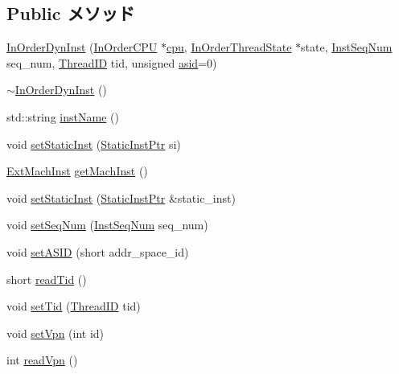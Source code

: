 \subsection*{Public メソッド}
\begin{DoxyCompactItemize}
\item 
\hyperlink{classInOrderDynInst_ab2dc23a7d8b60619acd58194f72f053a}{InOrderDynInst} (\hyperlink{classInOrderCPU}{InOrderCPU} $\ast$\hyperlink{classInOrderDynInst_a41d682c28d0f49e04393c52815808782}{cpu}, \hyperlink{classInOrderThreadState}{InOrderThreadState} $\ast$state, \hyperlink{inst__seq_8hh_a258d93d98edaedee089435c19ea2ea2e}{InstSeqNum} seq\_\-num, \hyperlink{base_2types_8hh_ab39b1a4f9dad884694c7a74ed69e6a6b}{ThreadID} tid, unsigned \hyperlink{classInOrderDynInst_a03f3e3cd7500e78001075b53eab05a53}{asid}=0)
\item 
\hyperlink{classInOrderDynInst_a507a5c030f96b7add10d1c29b386f727}{$\sim$InOrderDynInst} ()
\item 
std::string \hyperlink{classInOrderDynInst_af9ac6eff5f99a7cc559c32d473e417ab}{instName} ()
\item 
void \hyperlink{classInOrderDynInst_add5f0a42aa245dbea8868a9d869fceac}{setStaticInst} (\hyperlink{classRefCountingPtr}{StaticInstPtr} si)
\item 
\hyperlink{classInOrderDynInst_a5605d4fc727eae9e595325c90c0ec108}{ExtMachInst} \hyperlink{classInOrderDynInst_a90d70d753e57c018f4ce3e12e261d150}{getMachInst} ()
\item 
void \hyperlink{classInOrderDynInst_a26017c8613960be6f4be6409425efa85}{setStaticInst} (\hyperlink{classRefCountingPtr}{StaticInstPtr} \&static\_\-inst)
\item 
void \hyperlink{classInOrderDynInst_ad5dc49b24f38355cef2f30d4948ba38a}{setSeqNum} (\hyperlink{inst__seq_8hh_a258d93d98edaedee089435c19ea2ea2e}{InstSeqNum} seq\_\-num)
\item 
void \hyperlink{classInOrderDynInst_a0038e061ac1af4a45f8d301673483cd0}{setASID} (short addr\_\-space\_\-id)
\item 
short \hyperlink{classInOrderDynInst_ae9a8114c68d03d48ab3bcf7aab6745fc}{readTid} ()
\item 
void \hyperlink{classInOrderDynInst_ad1c2ae5b668e7024fd2b0f956aefaa4e}{setTid} (\hyperlink{base_2types_8hh_ab39b1a4f9dad884694c7a74ed69e6a6b}{ThreadID} tid)
\item 
void \hyperlink{classInOrderDynInst_a4cd838b59165907871b7de050d39e560}{setVpn} (int id)
\item 
int \hyperlink{classInOrderDynInst_a4f7740a5012b416112dfe30f37328efc}{readVpn} ()

\end{DoxyCompactItemize}
